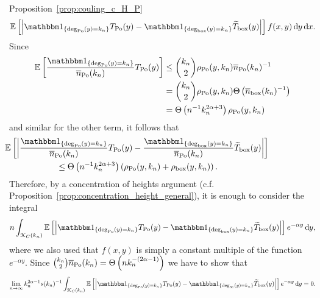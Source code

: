\begin{proofof}{Proposition~\ref{prop:couling_c_H_P}}
\begin{align*}
	        \Exp{\left|\ind{\mathrm{deg}_{\Po}(y) = k_n} T_{\Po}(y)
	        - \ind{\mathrm{deg}_{\mathrm{box}}(y) = k_n} \widetilde{T}_{\text{box}}(y)\right|} 
	        	f(x,y) \dd y \dd x.
\end{align*}
Since 
\begin{align*}
	\Exp{\frac{\ind{\mathrm{deg}_{\Po}(y) = k_n}}{\expH} T_{\Po}(y)}
	&\le \binom{k_n}{2} \rho_{\Po}(y,k_n)\expH^{-1} \\
	&= \binom{k_n}{2} \rho_{\Po}(y,k_n)\bigT{\expP^{-1}}\\
	&= \bigT{n^{-1} k_n^{2\alpha + 3}}\rho_{\Po}(y,k_n)
\end{align*}
and similar for the other term, it follows that
\begin{align*}
	&\hspace{-60pt}\Exp{ \left| \frac{\ind{\mathrm{deg}_{\Po}(y) = k_n}}{\expH} T_{\Po}(y)
		- \frac{\ind{\mathrm{deg}_{\mathrm{box}}(y) = k_n}}{\expH}  \widetilde{T}_{\text{box}}(y)\right|} \\
	&\le \bigT{n^{-1} k_n^{2\alpha + 3}}\left(\rho_{\Po}(y,k_n) + \rho_{\text{box}}(y,k_n)\right).
\end{align*}
Therefore, by a concentration of heights argument (c.f. Proposition~\ref{prop:concentration_height_general}), it is enough to consider the integral
\begin{equation} \label{eq:expectation_total}
	n \int_{\Kcal_{C}(k_n)} \Exp{\left|\ind{\mathrm{deg}_{\Po}(y) = k_n} T_{\Po}(y)
		- \ind{\mathrm{deg}_{\mathrm{box}}(y) = k_n} \widetilde{T}_{\mathrm{box}}(y)\right|} e^{-\alpha y} \dd y,
\end{equation}
where we also used that $f(x,y)$ is simply a constant multiple of the function $e^{-\alpha y}$. Since $\binom{k_n}{2}\overline{n}_{{\mathrm{Po}}}(k_n)
= \Theta\left(n k_n^{-(2\alpha - 1)}\right)$ we have to show that
\[
	\lim_{n \to \infty} k_n^{2\alpha - 1} s(k_n)^{-1} \int_{\Kcal_{C}(k_n)} 
		\Exp{\left|\ind{\mathrm{deg}_{\Po}(y) = k_n} T_{\Po}(y)
			- \ind{\mathrm{deg}_{\infty}(y) = k_n} \widetilde{T}_{\mathrm{box}}(y)\right|} e^{-\alpha y} \dd y = 0.
\] 


\end{proofof}
